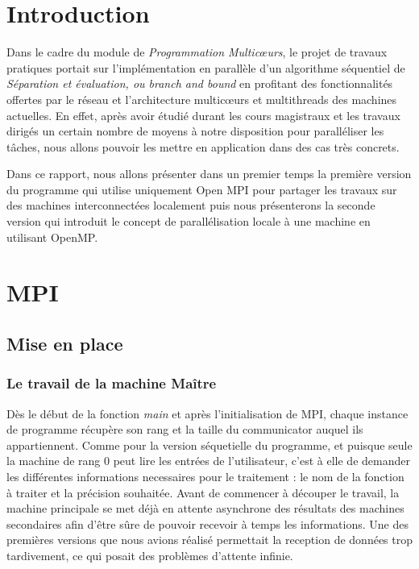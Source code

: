 \chapter*{Introduction}
	Dans le cadre du module de \emph{Programmation Multicœurs}, le projet de travaux pratiques portait sur l'implémentation en parallèle d'un algorithme séquentiel de \emph{Séparation et évaluation, ou branch and bound} en profitant des fonctionnalités offertes par le réseau et l'architecture multicœurs et multithreads des machines actuelles. En effet, après avoir étudié durant les cours magistraux et les travaux dirigés un certain nombre de moyens à notre disposition pour paralléliser les tâches, nous allons pouvoir les mettre en application dans des cas très concrets.
	
	Dans ce rapport, nous allons présenter dans un premier temps la première version du programme qui utilise uniquement Open MPI pour partager les travaux sur des machines interconnectées localement puis nous présenterons la seconde version qui introduit le concept de parallélisation locale à une machine en utilisant OpenMP. 
		

\chapter{MPI}
	\section{Mise en place}
		\subsection{Le travail de la machine \og Maître \fg}
			Dès le début de la fonction \emph{main} et après l'initialisation de MPI, chaque instance de programme récupère son rang et la taille du communicator auquel ils appartiennent. Comme pour la version séquetielle du programme, et puisque seule la machine de rang 0 peut lire les entrées de l'utilisateur, c'est à elle de demander les différentes informations necessaires pour le traitement : le nom de la fonction à traiter et la précision souhaitée. Avant de commencer à découper le travail, la machine principale se met déjà en attente asynchrone des résultats des machines secondaires afin d'être sûre de pouvoir recevoir à temps les informations. Une des premières versions que nous avions réalisé permettait la reception de données trop tardivement, ce qui posait des problèmes d'attente infinie. \\
			
